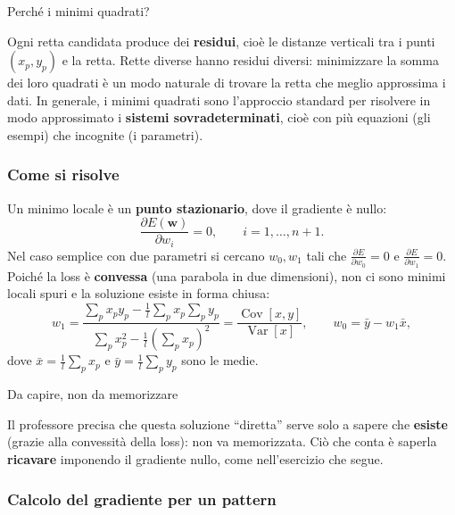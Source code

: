 \begin{boxtip}{Perché i minimi quadrati?}

Ogni retta candidata produce dei \textbf{residui}, cioè le distanze
verticali tra i punti \((x_p, y_p)\) e la retta. Rette diverse hanno
residui diversi: minimizzare la somma dei loro quadrati è un modo
naturale di trovare la retta che meglio approssima i dati. In generale,
i minimi quadrati sono l'approccio standard per risolvere in modo
approssimato i \textbf{sistemi sovradeterminati}, cioè con più equazioni
(gli esempi) che incognite (i parametri).

\end{boxtip}

\subsubsection{Come si risolve}\label{come-si-risolve}

Un minimo locale è un \textbf{punto stazionario}, dove il gradiente è
nullo: \[
\frac{\partial E(\mathbf{w})}{\partial w_i} = 0, \qquad i = 1, \dots, n+1.
\] Nel caso semplice con due parametri si cercano \(w_0, w_1\) tali che
\(\frac{\partial E}{\partial w_0} = 0\) e
\(\frac{\partial E}{\partial w_1} = 0\). Poiché la loss è
\textbf{convessa} (una parabola in due dimensioni), non ci sono minimi
locali spuri e la soluzione esiste in forma chiusa: \[
w_1 = \frac{\sum_p x_p y_p - \frac{1}{l}\sum_p x_p \sum_p y_p}{\sum_p x_p^2 - \frac{1}{l}\left(\sum_p x_p\right)^2} = \frac{\operatorname{Cov}[x,y]}{\operatorname{Var}[x]}, \qquad w_0 = \bar{y} - w_1 \bar{x},
\] dove \(\bar{x} = \frac{1}{l}\sum_p x_p\) e
\(\bar{y} = \frac{1}{l}\sum_p y_p\) sono le medie.

\begin{boxtip}{Da capire, non da memorizzare}

Il professore precisa che questa soluzione ``diretta'' serve solo a
sapere che \textbf{esiste} (grazie alla convessità della loss): non va
memorizzata. Ciò che conta è saperla \textbf{ricavare} imponendo il
gradiente nullo, come nell'esercizio che segue.

\end{boxtip}

\subsubsection{Calcolo del gradiente per un
pattern}\label{calcolo-del-gradiente-per-un-pattern}

